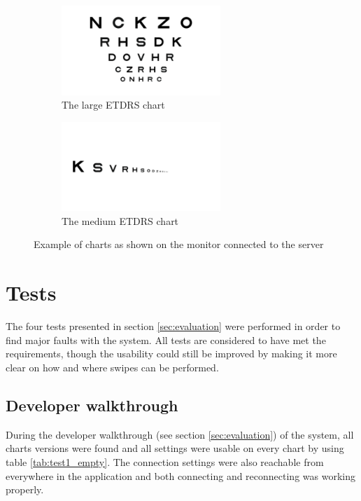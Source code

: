 \documentclass[12pt,a4paper,notitlepage]{report}
\begin{document}
\begin{figure}[ht!]
\centering
\begin{subfigure}{.5\textwidth}
  \centering
  \includegraphics[width=60mm]{images/servergui/etdrs_chart.png}
  \caption{The large ETDRS chart}
  \label{fig:server_large}
\end{subfigure}%
\begin{subfigure}{.5\textwidth}
  \centering
  \includegraphics[width=60mm]{images/servergui/etdrs_single_row.png}
  \caption{The medium ETDRS chart}
  \label{fig:server_medium}
\end{subfigure}
\caption{Example of charts as shown on the monitor connected to the server}
\label{fig:server_charts}
\end{figure}

\section{Tests}
The four tests presented in section \ref{sec:evaluation} were performed in order to find major faults with the system. All tests are considered to have met the requirements, though the usability could still be improved by making it more clear on how and where swipes can be performed.

\subsection{Developer walkthrough}
During the developer walkthrough (see section \ref{sec:evaluation}) of the system, all charts versions were found and all settings were usable on every chart by using table \ref{tab:test1_empty}. The connection settings were also reachable from everywhere in the application and both connecting and reconnecting was working properly.
\end{document}
